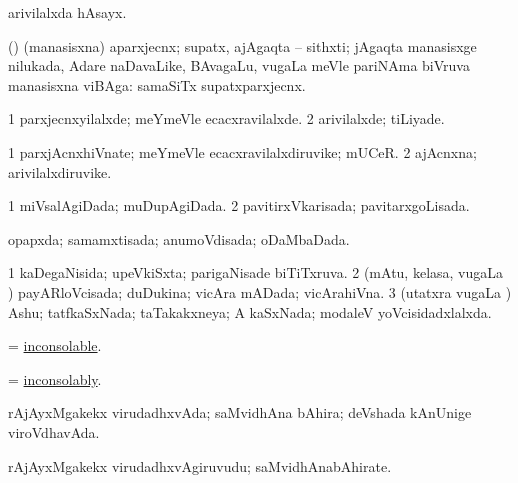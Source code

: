 \noindent
\gl{\pagu}
\expl{}
\bmng
{} arivilalxda hAsayx. 
\emng
\eentry

\bentry
{} 
\gl{\nA}
\expl{}
\bmng
 (\mavi) (manasisxna) aparxjecnx; supatx, ajAgaqta -- sithxti; jAgaqta manasisxge nilukada, Adare naDavaLike, BAvagaLu, \mo vugaLa meVle pariNAma biVruva manasisxna viBAga:  samaSiTx supatxparxjecnx. 
\emng
\eentry

\bentry
{} 
\gl{\kirxvi}
\expl{}
\bmng
\bnum
\num{1} parxjecnxyilalxde; meYmeVle ecacxravilalxde. 
\num{2} arivilalxde; tiLiyade. 
\enum
\emng
\eentry

\bentry
{} 
\gl{\nA}
\expl{}
\bmng
\bnum
\num{1} parxjAcnxhiVnate; meYmeVle ecacxravilalxdiruvike; mUCeR. 
\num{2} ajAcnxna; arivilalxdiruvike. 
\enum
\emng
\eentry

\bentry
{} 
\gl{\gu}
\expl{}
\bmng
\bnum
\num{1} miVsalAgiDada; muDupAgiDada. 
\num{2} pavitirxVkarisada; pavitarxgoLisada. 
\enum
\emng
\eentry

\bentry
{} 
\gl{\gu}
\expl{}
\bmng
 opapxda; samamxtisada; anumoVdisada; oDaMbaDada. 
\emng
\eentry

\bentry
{} 
\gl{\gu}
\expl{}
\bmng
\bnum
\num{1} kaDegaNisida; upeVkiSxta; parigaNisade biTiTxruva. 
\num{2} (mAtu, kelasa, \mo vugaLa \vi) payARloVcisada; duDukina; vicAra mADada; vicArahiVna. 
\num{3} (utatxra \mo vugaLa \vi) Ashu; tatfkaSxNada; taTakakxneya; A kaSxNada; modaleV yoVcisidadxlalxda. 
\enum
\emng
\eentry

\bentry
{} 
\gl{\gu}
\expl{}
\bmng
 = \hyperref{kandict_i.pdf}{I}{inconsolable}{inconsolable}. 
\emng
\eentry

\bentry
{} 
\gl{\kirxvi}
\expl{}
\bmng
= \hyperref{kandict_i.pdf}{I}{inconsolably}{inconsolably}. 
\emng
\eentry

\bentry
{} 
\gl{\gu}
\expl{}
\bmng
 rAjAyxMgakekx virudadhxvAda; saMvidhAna bAhira; deVshada kAnUnige viroVdhavAda. 
\emng
\eentry

\bentry
{} 
\gl{\nA}
\expl{}
\bmng
 rAjAyxMgakekx virudadhxvAgiruvudu; saMvidhAnabAhirate. 
\emng
\eentry

